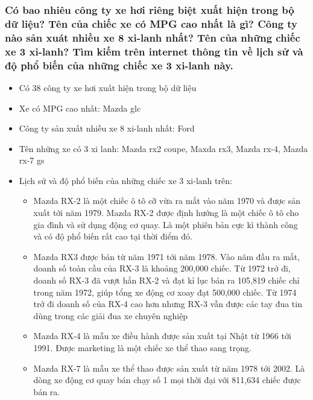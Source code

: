 \documentclass[a4paper, 12pt]{article}
\begin{document}
    \subsubsection{Có bao nhiêu công ty xe hơi riêng biệt xuất hiện trong bộ dữ liệu? Tên của chiếc xe có MPG cao nhất là gì? Công ty nào sản xuát nhiều xe 8 xi-lanh nhất? Tên của những chiếc xe 3 xi-lanh? Tìm kiếm trên internet thông tin về lịch sử và độ phổ biến của những chiếc xe 3 xi-lanh này.}
        \begin{itemize}
            \item Có 38 công ty xe hơi xuất hiện trong bộ dữ liệu
            \item Xe có MPG cao nhất: Mazda glc
            \item Công ty sản xuất nhiều xe 8 xi-lanh nhất: Ford
            \item Tên những xe có 3 xi lanh: Mazda rx2 coupe, Maxda rx3, Mazda rx-4, Mazda rx-7 gs
            \item Lịch sử và độ phổ biến của những chiếc xe 3 xi-lanh trên:
                \begin{itemize}
                    \item Mazda RX-2 là một chiếc ô tô cỡ vừa ra mắt vào năm 1970 và được sản xuất tới năm 1979. Mazda RX-2 được định hướng là một chiếc ô tô cho gia đình và sử dụng động cơ quay. Là một phiên bản cực kì thành công và có độ phổ biến rất cao tại thời điểm đó.
                    \item Mazda RX3 được bán từ năm 1971 tới năm 1978. Vào năm đầu ra mắt, doanh số toàn cầu của RX-3 là khoảng 200,000 chiếc. Từ 1972 trở đi, doanh số RX-3 đã vượt hẳn RX-2 và đạt kỉ lục bán ra 105,819 chiếc chỉ trong năm 1972, giúp tổng xe động cơ xoay đạt 500,000 chiếc. Từ 1974 trở đi doanh số của RX-4 cao hơn nhưng RX-3 vẫn được các tay đua tin dùng trong các giải đua xe chuyên nghiệp
                    \item Mazda RX-4 là mẫu xe điều hành được sản xuất tại Nhật từ 1966 tới 1991. Được marketing là một chiếc xe thể thao sang trọng.
                    \item Mazda RX-7 là mẫu xe thể thao được sản xuất từ năm 1978 tới 2002. Là dòng xe động cơ quay bán chạy số 1 mọi thời đại với 811,634 chiếc được bán ra. 
                \end{itemize}
        \end{itemize}
        
\end{document}
